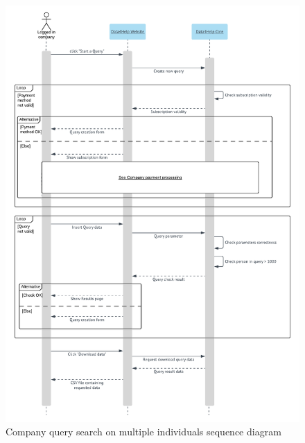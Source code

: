 \begin{figure}[H]
  \includegraphics[width=\textwidth,height=\textheight,keepaspectratio]{assets/sequence/CompanyQuerySearchOnMultipleIndividuals.pdf}
  \caption{Company query search on multiple individuals sequence diagram}
  \label{fig:CompanyQuerySearchOnMultipleIndividuals}
\end{figure}
















\newpage
